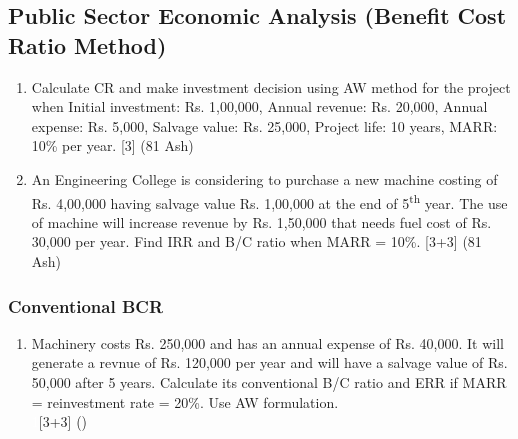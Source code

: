 \documentclass[12pt]{article}
\newcommand{\enter}{\\\textcolor{white}{1}}
\newcommand{\super}[1]{\textsuperscript{#1}}
\begin{document}
	\subsection{Public Sector Economic Analysis (Benefit Cost Ratio Method)}
		\begin{enumerate}
			\item Calculate CR and make investment decision using AW method for the project when Initial investment: Rs. 1,00,000, Annual revenue: Rs. 20,000, Annual expense: Rs. 5,000, Salvage value: Rs. 25,000, Project life: 10 years, MARR: 10\% per year. \hfill [3] (81 Ash)
			
			\item An Engineering College is considering to purchase a new machine costing of Rs. 4,00,000 having salvage value Rs. 1,00,000 at the end of 5\super{th} year. The use of machine will increase revenue by Rs. 1,50,000 that needs fuel cost of Rs. 30,000 per year. Find IRR and B/C ratio when MARR = 10\%. \hfill [3+3] (81 Ash)
		\end{enumerate}

		\subsubsection{Conventional BCR}
			\begin{enumerate}[noitemsep, topsep=0pt]
				\item Machinery costs Rs. 250,000 and has an annual expense of Rs. 40,000. It will generate a revnue of Rs. 120,000 per year and will have a salvage value of Rs. 50,000 after 5 years. Calculate its conventional B/C ratio and ERR if MARR = reinvestment rate = 20\%. Use AW formulation. \enter\hfill [3+3] ()
			\end{enumerate}
\end{document}
